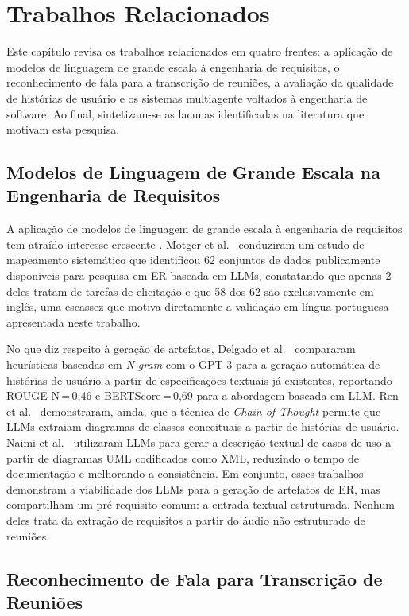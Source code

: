 
\chapter{Trabalhos Relacionados}
\label{cap:relacionados}

Este capítulo revisa os trabalhos relacionados em quatro frentes: a aplicação de modelos de linguagem de grande escala à engenharia de requisitos, o reconhecimento de fala para a transcrição de reuniões, a avaliação da qualidade de histórias de usuário e os sistemas multiagente voltados à engenharia de software. Ao final, sintetizam-se as lacunas identificadas na literatura que motivam esta pesquisa.

\section{Modelos de Linguagem de Grande Escala na Engenharia de Requisitos}

A aplicação de modelos de linguagem de grande escala à engenharia de requisitos tem atraído interesse crescente \cite{hort2025survey}. Motger et al.~\cite{motger2025share} conduziram um estudo de mapeamento sistemático que identificou 62 conjuntos de dados publicamente disponíveis para pesquisa em ER baseada em LLMs, constatando que apenas 2 deles tratam de tarefas de elicitação e que 58 dos 62 são exclusivamente em inglês, uma escassez que motiva diretamente a validação em língua portuguesa apresentada neste trabalho.

No que diz respeito à geração de artefatos, Delgado et al.~\cite{delgado2024aidriven} compararam heurísticas baseadas em \textit{N-gram} com o GPT-3 para a geração automática de histórias de usuário a partir de especificações textuais já existentes, reportando ROUGE-N\,=\,0,46 e BERTScore\,=\,0,69 para a abordagem baseada em LLM. Ren et al.~\cite{ren2024combining} demonstraram, ainda, que a técnica de \textit{Chain-of-Thought} permite que LLMs extraiam diagramas de classes conceituais a partir de histórias de usuário. Naimi et al.~\cite{naimi2024automating} utilizaram LLMs para gerar a descrição textual de casos de uso a partir de diagramas UML codificados como XML, reduzindo o tempo de documentação e melhorando a consistência. Em conjunto, esses trabalhos demonstram a viabilidade dos LLMs para a geração de artefatos de ER, mas compartilham um pré-requisito comum: a entrada textual estruturada. Nenhum deles trata da extração de requisitos a partir do áudio não estruturado de reuniões.

\section{Reconhecimento de Fala para Transcrição de Reuniões}

